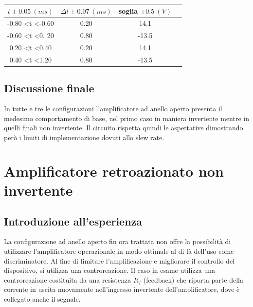 \documentclass[journal]{IEEEtran}
\begin{document}
\begin{tabular}{|c|c|c|c|}

\hline
$t  \pm 0.05 \ (ms)$ & $\Delta t \pm 0.07 \ (ms)$ & soglia $\pm 0.5 \ (V)$  \\ \hline
-0.80 \textless t \textless -0.60 & 0.20 & 14.1 \\ \hline %
-0.60 \textless t \textless 0. 20 & 0.80 & -13.5 \\ \hline %
0.20 \textless t \textless 0.40   & 0.20 & 14.1\\ \hline   %
0.40 \textless t \textless 1.20   & 0.80 & -13.5 \\ \hline %
\end{tabular}

\subsection{\textbf{Discussione finale }}
In tutte e tre le configurazioni l'amplificatore ad anello aperto presenta il medesimo comportamento di base, nel primo caso in maniera invertente mentre in quelli finali non invertente. Il circuito rispetta quindi le aspettative dimostrando però i limiti di implementazione dovuti allo slew rate. 


\section{\textbf{Amplificatore retroazionato non invertente}} %
\subsection{\textbf{Introduzione all'esperienza}}

La configurazione ad anello aperto fin ora trattata non offre la possibilità di utilizzare l'amplificatore operazionale in modo ottimale al di là dell'uso come discriminatore. Al fine di limitare l'amplificazione e migliorare il controllo del dispositivo, si utilizza una controreazione.
Il caso in esame utilizza una controreazione costituita da una resistenza $R_f$ (feedback) che riporta parte della corrente in uscita nuovamente nell'ingresso invertente dell'amplificatore, dove è collegato anche il segnale.
\end{document}
